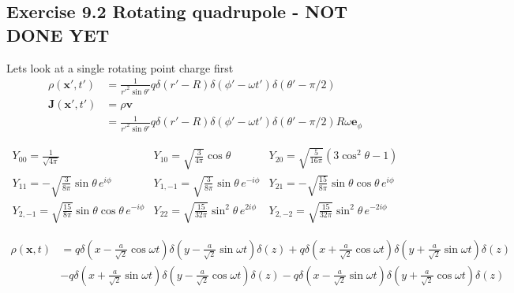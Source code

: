 \documentclass[../main.tex]{subfiles}
\begin{document}
\subsection{Exercise 9.2 Rotating quadrupole - NOT DONE YET}
Lets look at a single rotating point charge first
\begin{align}
\rho(\mathbf{x}',t')
&=\frac{1}{r'^2\sin\theta'}q\delta(r'-R)\delta(\phi'-\omega t')\delta(\theta'-\pi/2)\\
\mathbf{J}(\mathbf{x}',t')
&=\rho\mathbf{v}\\
&=\frac{1}{r'^2\sin\theta'}q\delta(r'-R)\delta(\phi'-\omega t')\delta(\theta'-\pi/2)R\omega\mathbf{e}_\phi
\end{align}

\begin{eqnarray}
Y_{00}=\frac{1}{\sqrt{4\pi}} 
&Y_{10}=\sqrt{\frac{3}{4\pi}}\cos\theta
&Y_{20}=\sqrt{\frac{5}{16\pi}}(3\cos^2\theta-1)\\
%
Y_{11}=-\sqrt{\frac{3}{8\pi}}\sin\theta\,e^{i\phi}
&Y_{1,-1}=\sqrt{\frac{3}{8\pi}}\sin\theta\,e^{-i\phi}
&Y_{21}=-\sqrt{\frac{15}{8\pi}}\sin\theta\cos\theta\,e^{i\phi}\\
%
Y_{2,-1}=\sqrt{\frac{15}{8\pi}}\sin\theta\cos\theta\,e^{-i\phi}
&Y_{22}=\sqrt{\frac{15}{32\pi}}\sin^2\theta\,e^{2i\phi}
&Y_{2,-2}=\sqrt{\frac{15}{32\pi}}\sin^2\theta\,e^{-2i\phi}
\end{eqnarray}



\begin{align}
\rho(\mathbf{x},t)
&=q\delta\left(x-\frac{a}{\sqrt{2}}\cos\omega t\right)\delta\left(y-\frac{a}{\sqrt{2}}\sin\omega t\right)\delta(z)
+q\delta\left(x+\frac{a}{\sqrt{2}}\cos\omega t\right)\delta\left(y+\frac{a}{\sqrt{2}}\sin\omega t\right)\delta(z)\\
&-q\delta\left(x+\frac{a}{\sqrt{2}}\sin\omega t\right)\delta\left(y-\frac{a}{\sqrt{2}}\cos\omega t\right)\delta(z)
-q\delta\left(x-\frac{a}{\sqrt{2}}\sin\omega t\right)\delta\left(y+\frac{a}{\sqrt{2}}\cos\omega t\right)\delta(z)\\
\end{align}
\end{document}
